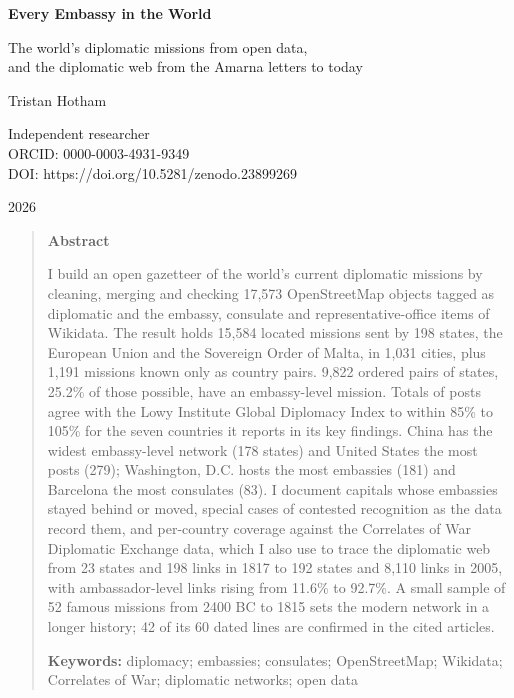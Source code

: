 \documentclass[11pt,a4paper]{article}
\begin{document}
\begin{center}
{\Large\bfseries Every Embassy in the World\par}
\vspace{0.4em}
{\large The world's diplomatic missions from open data,\\and the diplomatic web from the Amarna letters to today\par}
\vspace{1.2em}
{\large Tristan Hotham\par}
\vspace{0.3em}
{\small Independent researcher\\
ORCID: 0000-0003-4931-9349\\
DOI: https://doi.org/10.5281/zenodo.23899269\par}
\vspace{0.8em}
2026
\end{center}

\begin{quote}
\small
\begin{center}\textbf{Abstract}\end{center}
I build an open gazetteer of the world's current diplomatic missions by cleaning, merging and checking 17,573 OpenStreetMap objects tagged as diplomatic and the embassy, consulate and representative-office items of Wikidata. The result holds 15,584 located missions sent by 198 states, the European Union and the Sovereign Order of Malta, in 1,031 cities, plus 1,191 missions known only as country pairs. 9,822 ordered pairs of states, 25.2\% of those possible, have an embassy-level mission. Totals of posts agree with the Lowy Institute Global Diplomacy Index to within 85\% to 105\% for the seven countries it reports in its key findings. China has the widest embassy-level network (178 states) and United States the most posts (279); Washington, D.C. hosts the most embassies (181) and Barcelona the most consulates (83). I document capitals whose embassies stayed behind or moved, special cases of contested recognition as the data record them, and per-country coverage against the Correlates of War Diplomatic Exchange data, which I also use to trace the diplomatic web from 23 states and 198 links in 1817 to 192 states and 8,110 links in 2005, with ambassador-level links rising from 11.6\% to 92.7\%. A small sample of 52 famous missions from 2400 BC to 1815 sets the modern network in a longer history; 42 of its 60 dated lines are confirmed in the cited articles.

\textbf{Keywords:} diplomacy; embassies; consulates; OpenStreetMap; Wikidata; Correlates of War; diplomatic networks; open data
\end{quote}
\end{document}
